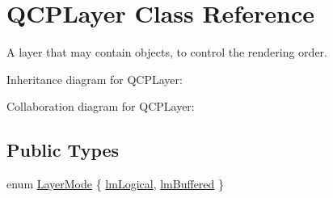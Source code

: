 \hypertarget{classQCPLayer}{}\section{Q\+C\+P\+Layer Class Reference}
\label{classQCPLayer}


A layer that may contain objects, to control the rendering order.  




Inheritance diagram for Q\+C\+P\+Layer\+:


Collaboration diagram for Q\+C\+P\+Layer\+:
\subsection*{Public Types}
\begin{DoxyCompactItemize}
\item 
enum \hyperlink{classQCPLayer_a67dcfc1590be2a1f2227c5a39bb59c7c}{Layer\+Mode} \{ \hyperlink{classQCPLayer_a67dcfc1590be2a1f2227c5a39bb59c7ca02eb5e9a4cb7f1baf1e2b6b99e3b87ce}{lm\+Logical}, 
\hyperlink{classQCPLayer_a67dcfc1590be2a1f2227c5a39bb59c7cab581b9fab3007c4c65f057f4185d7538}{lm\+Buffered}
 \}
\end{DoxyCompactItemize}
